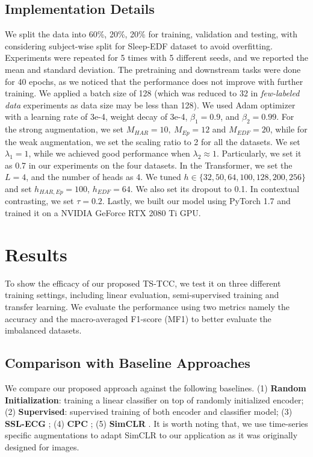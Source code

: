 \documentclass{article}
\begin{document}
\subsection{Implementation Details}
We split the data into 60\%, 20\%, 20\% for training, validation and testing, with considering subject-wise split for Sleep-EDF dataset to avoid overfitting.
Experiments were repeated for 5 times with 5 different seeds, and we reported the mean and standard deviation.
The pretraining and downstream tasks were done for 40 epochs, as we noticed that the performance does not improve with further training.
We applied a batch size of 128 (which was reduced to 32 in \textit{few-labeled data} experiments as data size may be less than 128).
We used Adam optimizer with a learning rate of 3e-4, weight decay of 3e-4, $\beta_1 = 0.9$, and $\beta_2 = 0.99$.
For the strong augmentation, we set $M_{HAR}=10,~M_{Ep}=12$ and $M_{EDF}=20$, while for the weak augmentation, we set the scaling ratio to 2 for all the datasets.
We set $\lambda_1=1$, while we achieved good performance when $\lambda_2 \approx 1$. Particularly, we set it as 0.7 in our experiments on the four datasets.
In the Transformer, we set the $L=4$, and the number of heads as 4. We tuned $h \in \{32, 50, 64, 100, 128, 200, 256\}$ and set $h_{HAR,Ep}=100$, $h_{EDF}=64$. We also set its dropout to 0.1.
In contextual contrasting, we set $\tau=0.2$.
Lastly, we built our model using PyTorch 1.7 and trained it on a NVIDIA GeForce RTX 2080 Ti GPU.





\section{Results}
To show the efficacy of our proposed TS-TCC, we test it on three different training settings, including linear evaluation, semi-supervised training and transfer learning. 
We evaluate the performance using two metrics namely the accuracy and the macro-averaged F1-score (MF1) to better evaluate the imbalanced datasets. 


\subsection{Comparison with Baseline Approaches}
We compare our proposed approach against the following baselines. 
(1) \textbf{Random Initialization}: training a linear classifier on top of randomly initialized encoder; (2) \textbf{Supervised}: supervised training of both encoder and classifier model; (3) \textbf{SSL-ECG} \cite{ecg_emotion_rec};
(4) \textbf{CPC} \cite{oord2018representation}; (5)  \textbf{SimCLR} \cite{chen2020simple}. It is worth noting that, we use time-series specific augmentations to adapt SimCLR to our application as it was originally designed for images.
\end{document}
